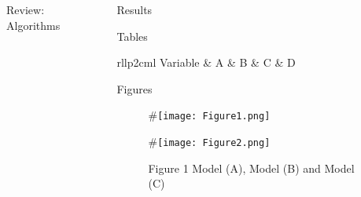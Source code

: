 \begin{frame}[t]
\begin{columns}[t]
\begin{column}{\onecolwid}
\begin{alertblock}{Review: Algorithms}
\end{alertblock}
\end{column}
\begin{column}{\onecolwid} %
\begin{alertblock}{Results}

\begin{enumerate}
\end{enumerate}

\end{alertblock}
\begin{alertblock}{Tables}

\vspace{4pt}
\centering
\begin{table}[h]\footnotesize
	\caption{}
	\begin{tabular}{rllp{2cm}l}
		\hline	
		Variable & A & B & C & D \\
		\hline 
	\end{tabular}	
\end{table}

\end{alertblock}
\begin{alertblock}{Figures}
\begin{figure}[H]
	\centering
	\begin{minipage}[b]{0.5\linewidth}
		#\texttt{[image: Figure1.png]}
	\end{minipage}\hfill
	\begin{minipage}[b]{0.5\linewidth}
		#\texttt{[image: Figure2.png]}
	\end{minipage}\hfill
	\caption{Figure 1 Model (A), Model (B) and Model (C)}
	\label{fig:Figure1}
\end{figure}


\end{alertblock}
\end{column}
\end{columns}
\end{frame}

